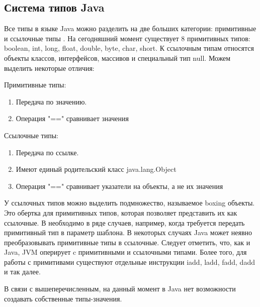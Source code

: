 \subsection{Система типов Java}
Все типы в языке Java можно разделить на две больших категории: примитивные и ссылочные типы \cite{java-spec}. На сегодняшний момент существует 8 примитивных типов: boolean, int,
long, float, double, byte, char, short. К ссылочным типам относятся объекты классов, интерфейсов, массивов и специальный тип null. Можем выделить некоторые отличия:
\par
Примитивные типы:
\begin{enumerate}
	\item Передача по значению.
	\item Операция "==" сравнивает значения 
\end{enumerate}
Ссылочные типы:
\begin{enumerate}
	\item Передача по ссылке.
	\item Имеют единый родительский класс java.lang.Object
	\item Операция "==" сравнивает указатели на объекты, а не их значения
\end{enumerate}
У ссылочных типов можно выделить подмножество, называемое boxing объекты. Это обертка для примитивных типов, которая позволяет представить их как ссылочные. В необходимо в ряде случаев, например, когда требуется передать примитивный тип в параметр шаблона. В некоторых случаях Java может неявно преобразовывать примитивные типы в ссылочные.
Следует отметить, что, как и Java, JVM оперирует c примитивными и ссылочными типами\cite{jvm-spec}. Более того, для работы с примитивами существуют отдельные инструкции iadd, ladd, fadd, dadd и так далее.
\par
В связи с вышеперечисленным, на данный момент в Java нет возможности создавать собственные типы-значения.

\clearpage
